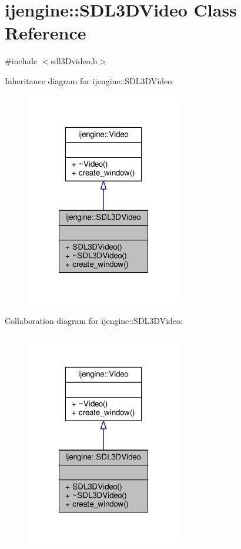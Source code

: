\hypertarget{classijengine_1_1SDL3DVideo}{\section{ijengine\-:\-:S\-D\-L3\-D\-Video Class Reference}
\label{classijengine_1_1SDL3DVideo}
}


{\ttfamily \#include $<$sdl3\-Dvideo.\-h$>$}



Inheritance diagram for ijengine\-:\-:S\-D\-L3\-D\-Video\-:\nopagebreak
\begin{figure}[H]
\begin{center}
\leavevmode
\includegraphics[width=192pt]{classijengine_1_1SDL3DVideo__inherit__graph}
\end{center}
\end{figure}


Collaboration diagram for ijengine\-:\-:S\-D\-L3\-D\-Video\-:\nopagebreak
\begin{figure}[H]
\begin{center}
\leavevmode
\includegraphics[width=192pt]{classijengine_1_1SDL3DVideo__coll__graph}
\end{center}
\end{figure}
